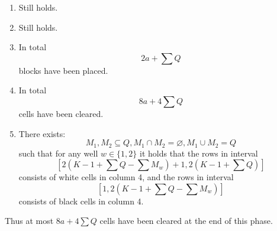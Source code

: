 \begin{enumerate}
\item Still holds.
\item Still holds.
\item In total
\begin{equation*}
    2a + \sum Q
\end{equation*}
blocks have been placed.

\item In total
\begin{equation*}
    8a + 4 \sum Q
\end{equation*}
cells have been cleared.

\item There exists:
\begin{equation*}
    M_1, M_2 \subseteq Q, M_1 \cap M_2 = \varnothing, M_1 \cup M_2 = Q
\end{equation*}
such that for any well $w \in \{1,2\}$ it holds that the rows in interval
\begin{equation*}
        \left[ 2 \left( K-1 + \sum Q - \sum M_w \right) +1, 2 \left( K-1 + \sum Q \right) \right]
    \end{equation*}
consists of white cells in column 4, and the rows in interval
    \begin{equation*}
        \left[ 1, 2 \left( K-1 + \sum Q - \sum M_w \right) \right]
    \end{equation*}
consists of black cells in column 4.

\end{enumerate}

Thus at most $8a + 4 \sum Q$ cells have been cleared at the end of this phase.

